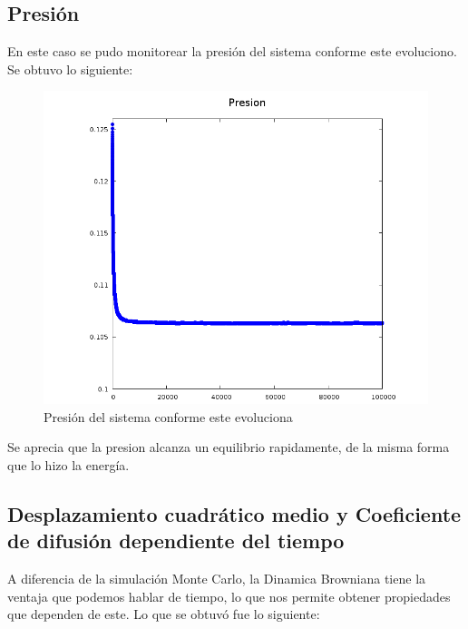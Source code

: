 \documentclass[12pt,letterpaper]{article}
\begin{document}
\subsection*{Presión}
En este caso se pudo monitorear la presión del sistema conforme este evoluciono. Se obtuvo lo siguiente:

\begin{figure}[H]
	\centering
	\includegraphics[width=0.75\linewidth]{Presion.png}
	\caption{Presión del sistema conforme este evoluciona}
	\label{Press}
\end{figure}
Se aprecia que la presion alcanza un equilibrio rapidamente, de la misma forma que lo hizo la energía.

\subsection*{Desplazamiento cuadrático medio y Coeficiente de difusión dependiente del tiempo}

A diferencia de la simulación Monte Carlo, la Dinamica Browniana tiene la ventaja que podemos hablar de tiempo, lo que nos permite obtener propiedades que dependen de este. Lo que se obtuvó fue lo siguiente:
\end{document}
